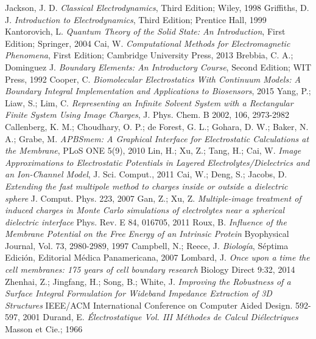 \documentclass[12pt, oneside, numbers, spanish]{ezthesis}
\numberwithin{equation}{section}
\begin{document}
\begin{thebibliography}{20}
Jackson, J. D. \textit{Classical Electrodynamics}, Third Edition; Wiley, 1998
Griffiths, D. J. \textit{Introduction to Electrodynamics}, Third Edition; Prentice Hall, 1999
Kantorovich, L. \textit{Quantum Theory of the Solid State: An Introduction}, First Edition; Springer, 2004
Cai, W. \textit{Computational Methods for Electromagnetic Phenomena}, First Edition; Cambridge University Press, 2013
Brebbia, C. A.; Dominguez J. \textit{Boundary Elements: An Introductory Course}, Second Edition; WIT Press, 1992
Cooper, C. \textit{Biomolecular Electrostatics With Continuum Models: A Boundary Integral Implementation and Applications to Biosensors}, 2015
Yang, P.; Liaw, S.; Lim, C. \textit{Representing an Infinite Solvent System with a Rectangular Finite System Using Image Charges}, J. Phys. Chem. B 2002, 106, 2973-2982
Callenberg, K. M.; Choudhary, O. P.; de Forest, G. L.; Gohara, D. W.; Baker, N. A.; Grabe, M. \textit{APBSmem: A Graphical Interface for Electrostatic Calculations at the Membrane}, PLoS ONE 5(9), 2010
Lin, H.; Xu, Z.; Tang, H.; Cai, W. \textit{Image Approximations to Electrostatic Potentials in Layered Electrolytes/Dielectrics and an Ion-Channel Model}, J. Sci. Comput., 2011
Cai, W.; Deng, S.; Jacobs, D. \textit{Extending the fast multipole method to charges inside or outside a dielectric sphere} J. Comput. Phys. 223, 2007
Gan, Z.; Xu, Z. \textit{Multiple-image treatment of induced charges in Monte Carlo simulations of electrolytes near a spherical dielectric interface} Phys. Rev. E 84, 016705, 2011
Roux, B. \textit{Influence of the Membrane Potential on the Free Energy of an Intrinsic Protein} Byophysical Journal, Vol. 73, 2980-2989, 1997
Campbell, N.; Reece, J. \textit{Biología}, Séptima Edición, Editorial Médica Panamericana, 2007
Lombard, J. \textit{Once upon a time the cell membranes: 175 years of cell boundary research} Biology Direct 9:32, 2014
Zhenhai, Z.; Jingfang, H.; Song, B.; White, J. \textit{Improving the Robustness of a Surface Integral Formulation for Wideband Impedance Extraction of 3D Structures} IEEE/ACM International Conference on Computer Aided Design. 592-597, 2001 
Durand, E. \textit{Électrostatique Vol. III Méthodes de Calcul Diélectriques} Masson et Cie.; 1966
\end{thebibliography}


\end{document}
